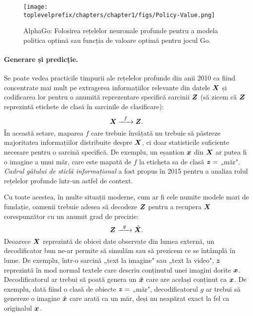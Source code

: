 \documentclass[../../book-main_ro.tex]{subfiles}
\begin{document}
\begin{figure}
    \centering
    \texttt{[image: \\toplevelprefix/chapters/chapter1/figs/Policy-Value.png]}
    \caption{AlphaGo: Folosirea rețelelor neuronale profunde pentru a modela politica optimă sau funcția de valoare optimă pentru jocul Go.}
    \label{fig:Alpha-Go}
\end{figure}

\paragraph{Generare și predicție.}
Se poate vedea practicile timpurii ale rețelelor profunde din anii 2010 ca fiind concentrate mai mult pe extragerea informațiilor relevante din datele $\bm{X}$ și codificarea lor pentru o anumită reprezentare specifică sarcinii $\bm{Z}$ (să zicem că $\bm{Z}$ reprezintă etichete de clasă în sarcinile de clasificare):
\begin{equation}
    \bm{X}   \xrightarrow{\hspace{2mm} f \hspace{2mm}} \bm{Z}.
       \label{eqn:encoding-deep-networks}
\end{equation}
În această setare, maparea $f$ care trebuie învățată nu trebuie să păstreze majoritatea informațiilor distribuite despre $\bm{X}$, ci doar statisticile suficiente necesare pentru o sarcină specifică. De exemplu, un eșantion $\bm{x}$ din $\bm{X}$ ar putea fi o imagine a unui măr, care este mapată de $f$ la eticheta sa de clasă $\bm{z} =$ „măr". {\em Cadrul gâtului de sticlă informațional} \cite{Tishby-ITW2015} a fost propus în 2015 pentru a analiza rolul rețelelor profunde într-un astfel de context.

Cu toate acestea, în multe situații moderne, cum ar fi cele numite modele mari de fundație, oamenii trebuie adesea să decodeze $\bm{Z}$ pentru a recupera $\bm{X}$ corespunzător cu un anumit grad de precizie:
\begin{equation}
    \bm{Z}   \xrightarrow{\hspace{2mm} g  \hspace{2mm}} \hat {\bm{X}}.
       \label{eqn:decoding-deep-networks}
\end{equation}
Deoarece $\bm{X}$ reprezintă de obicei date observate din lumea externă, un decodificator bun ne-ar permite să simulăm sau să prezicem ce se întâmplă în lume. De exemplu, într-o sarcină „text la imagine" sau „text la video", $\bm{z}$ reprezintă în mod normal textele care descriu conținutul unei imagini dorite $\bm{x}$. Decodificatorul ar trebui să poată genera un $\hat {\bm{x}}$ care are același conținut ca $\bm{x}$. De exemplu, dată fiind o clasă de obiecte $\bm{z} = $ „măr", decodificatorul $g$ ar trebui să genereze o imagine $\hat {\bm{x}}$ care arată ca un măr, deși nu neapărat exact la fel ca originalul $\bm{x}$.
\end{document}

